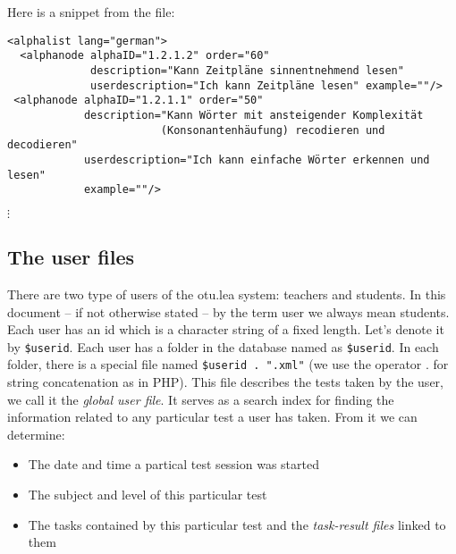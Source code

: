 \documentclass{scrartcl}
\begin{document}
Here is a snippet from the file:
\begin{verbatim}
<alphalist lang="german">
  <alphanode alphaID="1.2.1.2" order="60"
             description="Kann Zeitpläne sinnentnehmend lesen" 
             userdescription="Ich kann Zeitpläne lesen" example=""/>
 <alphanode alphaID="1.2.1.1" order="50" 
            description="Kann Wörter mit ansteigender Komplexität 
                        (Konsonantenhäufung) recodieren und decodieren" 
            userdescription="Ich kann einfache Wörter erkennen und lesen" 
            example=""/>
\end{verbatim}
\quad$\vdots$
\subsection{The user files}\label{subsection:userfiles}
There are two type of users of the otu.lea system: teachers and students. In this document -- if not otherwise stated -- by the term user we always mean students. Each user has an id which is a character string of a fixed length. Let's denote it by \verb+$userid+. Each user has a folder in the database named as \verb+$userid+. In each folder, there is a special file named \verb+$userid . ".xml"+ (we use the operator . for string concatenation as in PHP). This file describes the tests taken by the user, we call it the \emph{global user file}. It serves as a search index for finding the information related to any particular test a user has taken. From it we can determine:
\begin{itemize}
\item The date and time a partical test session was started
\item The subject and level of this particular test
\item The tasks contained by this particular test and the \emph{task-result files} linked to them
\end{itemize}
\end{document}
